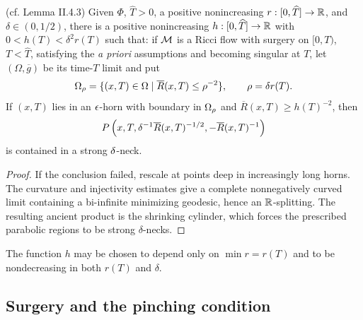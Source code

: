 \begin{lemma}
  \label{lem:kl-necks-horns-existence-ricci-flow-surgery}
(cf. Lemma II.4.3) \label{lemmaII.4.3}
\label{hexists}
Given $\Phi$, $\widehat T>0$, a positive nonincreasing
$r:[0,\widehat T]\rightarrow{\mathbb R}$, and $\delta\in(0,1/2)$, there is a positive
nonincreasing $h:[0,\widehat T]\rightarrow{\mathbb R}$ with $0<h(T)<\delta^2r(T)$ such that:
if ${\mathcal M}$ is a Ricci flow with surgery on $[0,T)$, $T<\widehat T$, satisfying
the \emph{a priori} assumptions and becoming singular at $T$, let
$(\Omega,\overline g)$ be its time-$T$ limit and put
\[
\Omega_\rho=\{(x,T)\in\Omega\mid\overline R(x,T)\leq\rho^{-2}\},\qquad
\rho=\delta r(T).
\]
If $(x,T)$ lies in an $\epsilon$-horn with boundary in $\Omega_\rho$ and
$\overline R(x,T)\geq h(T)^{-2}$, then
\[
P\left(x,T,\delta^{-1}\overline R(x,T)^{-1/2},-\overline R(x,T)^{-1}\right)
\]
is contained in a strong $\delta$-neck.
\end{lemma}
\begin{proof}
\sketch If the conclusion failed, rescale at points deep in increasingly long
horns. The curvature and injectivity estimates give a complete nonnegatively
curved limit containing a bi-infinite minimizing geodesic, hence an
${\mathbb R}$-splitting. The resulting ancient product is the shrinking cylinder,
which forces the prescribed parabolic regions to be strong $\delta$-necks.
\end{proof}

\begin{remark}
  \label{rem:kl-necks-horns-monotonicity-neck-geometry}
The function $h$ may be chosen to depend only on $\min r=r(T)$ and to be
nondecreasing in both $r(T)$ and $\delta$.
\end{remark}

\subsection{Surgery and the pinching condition} \label{surgery}

